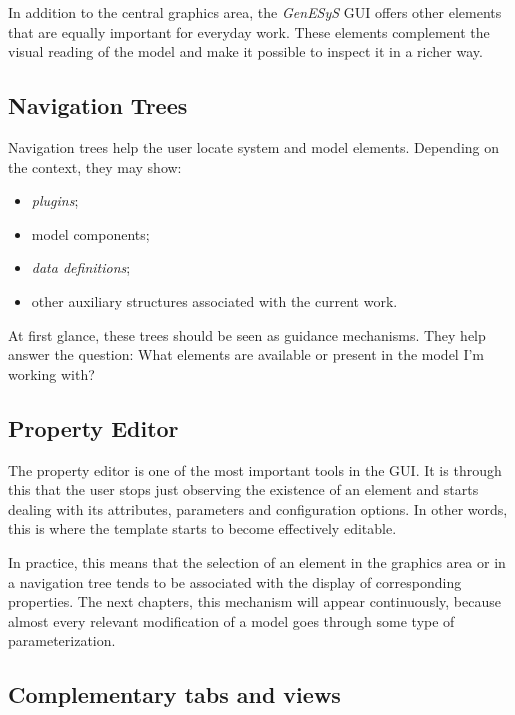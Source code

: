 In addition to the central graphics area, the \textit{GenESyS} GUI offers other elements that are equally important for everyday work. These elements complement the visual reading of the model and make it possible to inspect it in a richer way.

\subsection{Navigation Trees}
\label{subsec:cap3_arvores_navegacao}

Navigation trees help the user locate system and model elements. Depending on the context, they may show:
\begin{itemize}
\item \textit{plugins};
\item model components;
\item \textit{data definitions};
\item other auxiliary structures associated with the current work.
\end{itemize}

At first glance, these trees should be seen as guidance mechanisms. They help answer the question: What elements are available or present in the model I'm working with?

\subsection{Property Editor}
\label{subsec:cap3_editor_propriedades}

The property editor is one of the most important tools in the GUI. It is through this that the user stops just observing the existence of an element and starts dealing with its attributes, parameters and configuration options. In other words, this is where the template starts to become effectively editable.

In practice, this means that the selection of an element in the graphics area or in a navigation tree tends to be associated with the display of corresponding properties. The next chapters, this mechanism will appear continuously, because almost every relevant modification of a model goes through some type of parameterization.

\subsection{Complementary tabs and views}
\label{subsec:cap3_abas_visoes_complementares}


